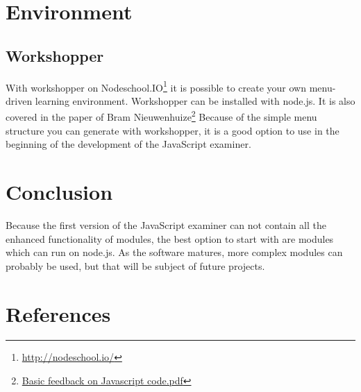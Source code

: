 \documentclass{article}
\begin{document}
\section{Environment}
\subsection{Workshopper}
With workshopper on Nodeschool.IO\footnote{\url{http://nodeschool.io/}} it is possible to create your own menu-driven learning environment. 
Workshopper can be installed with node.js.
It is also covered in the paper of Bram Nieuwenhuize\footnote{\url{Basic feedback on Javascript code.pdf}}
Because of the simple menu structure you can generate with workshopper, it is a good option to use in the 
beginning of the development of the JavaScript examiner.

\section{Conclusion}
Because the first version of the JavaScript examiner can not contain all the enhanced 
functionality of modules, the best option to start with are modules which can run on node.js.
As the software matures, more complex modules can probably be used, but that will be subject of future projects.

\section{References}
\end{document}
